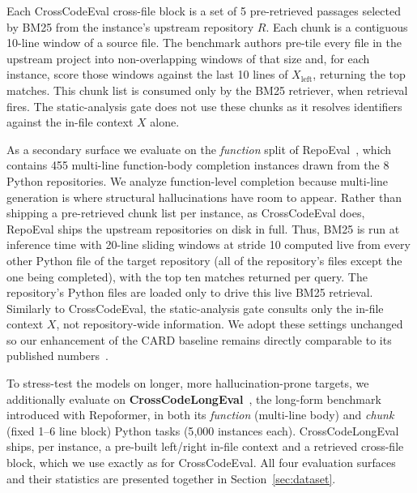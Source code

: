 \documentclass[10pt,conference]{IEEEtran}
\newcommand{\rev}[1]{{\color{red}#1}}
\newcommand{\new}[1]{{\color{blue}#1}}
\newcommand{\ugr}[1]{{\color{revgreen}#1}}
\begin{document}
\ugr{Each CrossCodeEval cross-file block is} a set of 5 pre-retrieved
passages selected by BM25 from \ugr{the instance's upstream repository $R$}. Each chunk is a contiguous 10-line window of a source file. The benchmark authors pre-tile every file in the upstream project into non-overlapping windows of that size and, for each instance, score those windows
against the last 10 lines of $X_{\text{left}}$, returning the top
matches. \new{This chunk list is consumed only by the BM25 retriever, when
retrieval fires. The static-analysis gate does
not use these chunks as it resolves identifiers against the in-file context
$X$ alone.}

As a secondary surface we evaluate on \rev{the \emph{function} split of}
RepoEval~\cite{zhang2023repocoder}, \rev{which contains 455 multi-line
function-body completion instances} drawn from the 8 Python repositories.
\rev{We analyze function-level completion
because multi-line generation is where structural hallucinations have room to
appear.} Rather than shipping a pre-retrieved chunk list per instance, as CrossCodeEval does, RepoEval ships the upstream repositories on disk in full. Thus, BM25 is run at inference time with 20-line sliding windows at stride 10 computed live from \ugr{every other Python file of the target repository (all of the repository's files except the one being completed)}, with the top ten matches returned per query. \new{The repository's Python files are loaded only to drive this live BM25 retrieval. Similarly to CrossCodeEval, the static-analysis gate consults only the in-file context $X$, not repository-wide information.} We adopt these settings unchanged so our enhancement of the CARD baseline remains directly comparable to its published numbers~\cite{zhang2024card}.

\rev{To stress-test the models on longer, more hallucination-prone targets, we
additionally evaluate on \textbf{CrossCodeLongEval}~\cite{wu2024repoformer}, the
long-form benchmark introduced with Repoformer, in both its \emph{function}
(multi-line body) and \emph{chunk} (fixed 1--6 line block) Python tasks
(5{,}000 instances each). CrossCodeLongEval ships, per instance, a pre-built
left/right in-file context and a retrieved cross-file block, which we use exactly
as for CrossCodeEval. All four evaluation surfaces and their statistics are
presented together in Section~\ref{sec:dataset}.}
\end{document}
